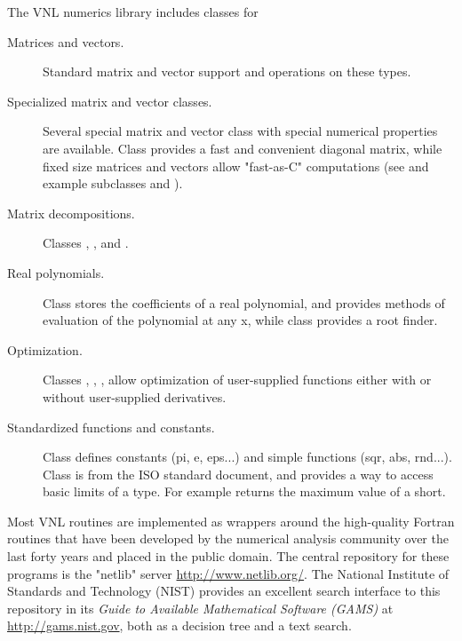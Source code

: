 The VNL numerics library includes classes for
\begin{description}
        \item[Matrices and vectors.] Standard matrix and vector support
        and operations on these types.

        \item[Specialized matrix and vector classes.] Several special matrix
        and vector class with special numerical properties are
        available. Class  provides a fast and
        convenient diagonal matrix, while fixed size matrices and vectors
        allow "fast-as-C" computations (see  
        and example subclasses  and 
        ).

        \item[Matrix decompositions.] Classes , 
        , and 
        . 

        \item[Real polynomials.] Class  stores 
        the coefficients of a real polynomial, and provides methods of 
        evaluation of the polynomial at any x, while class 
         provides a root finder. 

        \item[Optimization.] Classes ,
        , , 
         allow optimization of user-supplied
        functions either with or without user-supplied derivatives.

        \item[Standardized functions and constants.] Class 
        defines constants (pi, e, eps...) and simple functions (sqr, abs,
        rnd...). Class  is from the ISO standard
        document, and provides a way to access basic limits of a
        type. For example  returns the maximum
        value of a short.
\end{description}

Most VNL routines are implemented as wrappers around the high-quality Fortran
routines that have been developed by the numerical analysis community over
the last forty years and placed in the public domain. The central repository
for these programs is the "netlib" server \url{http://www.netlib.org/}. The
National Institute of Standards and Technology (NIST) provides an excellent
search interface to this repository in its \emph{Guide to Available Mathematical
Software (GAMS)} at \url{http://gams.nist.gov}, both as a decision tree and a
text search.

